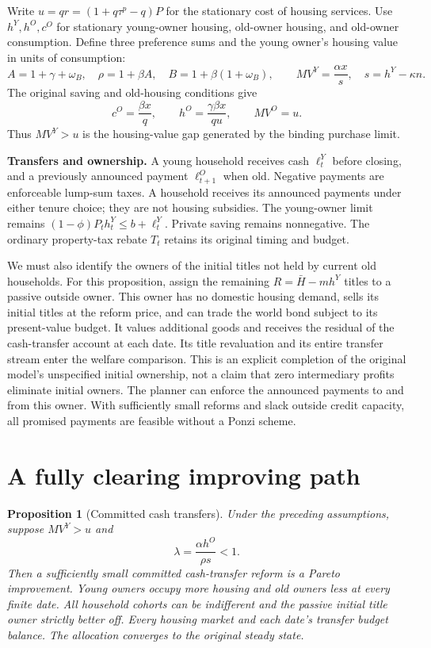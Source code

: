 \documentclass[11pt]{article}
\newtheorem{proposition}{Proposition}
\begin{document}
Write $u=q r=(1+q\tau^p-q)P$ for the stationary cost of housing services.
Use $h^Y,h^O,c^O$ for stationary young-owner housing, old-owner housing, and
old-owner consumption. Define three preference sums and the young owner's
housing value in units of consumption:
\begin{equation}
 A=1+\gamma+\omega_B,\quad
 \rho=1+\beta A,\quad B=1+\beta(1+\omega_B),\qquad
 MV^Y=\frac{\alpha x}{s},\quad s=h^Y-\kappa n.
\end{equation}
The original saving and old-housing conditions give
\begin{equation}
 c^O=\frac{\beta x}{q},\qquad
 h^O=\frac{\gamma\beta x}{q u},\qquad MV^O=u.
 \label{eq:ss}
\end{equation}
Thus $MV^Y>u$ is the housing-value gap generated by the binding purchase limit.

\textbf{Transfers and ownership.} A young household receives cash $\ell_t^Y$
before closing, and a previously announced payment $\ell_{t+1}^O$ when old.
Negative payments are enforceable lump-sum taxes. A household receives its
announced payments under either tenure choice; they are not housing subsidies.
The young-owner limit remains
$(1-\phi)P_t h_t^Y\leq b+\ell_t^Y$. Private saving remains nonnegative.
The ordinary property-tax rebate $T_t$ retains its original timing and budget.

We must also identify the owners of the initial titles not held by current old
households. For this proposition, assign the remaining
$R=\bar H-mh^Y$ titles to a passive outside owner. This owner has no domestic
housing demand, sells its initial titles at the reform price, and can trade the
world bond subject to its present-value budget. It values additional goods and
receives the residual of the cash-transfer account at each date. Its title
revaluation and its entire transfer stream enter the welfare comparison.
This is an explicit completion of the original model's unspecified initial
ownership, not a claim that zero intermediary profits eliminate initial owners.
The planner can enforce the announced payments to and from this owner.
With sufficiently small reforms and slack outside credit capacity, all promised
payments are feasible without a Ponzi scheme.

\section{A fully clearing improving path}

\begin{proposition}[Committed cash transfers]
Under the preceding assumptions, suppose $MV^Y>u$ and
\begin{equation}
 \lambda=\frac{\alpha h^O}{\rho s}<1.
 \label{eq:contraction}
\end{equation}
Then a sufficiently small committed cash-transfer reform is a Pareto
improvement. Young owners occupy more housing and old owners less at every
finite date. All household cohorts can be indifferent and the passive initial
title owner strictly better off. Every housing market and each date's transfer
budget balance. The allocation converges to the original steady state.
\end{proposition}
\end{document}
